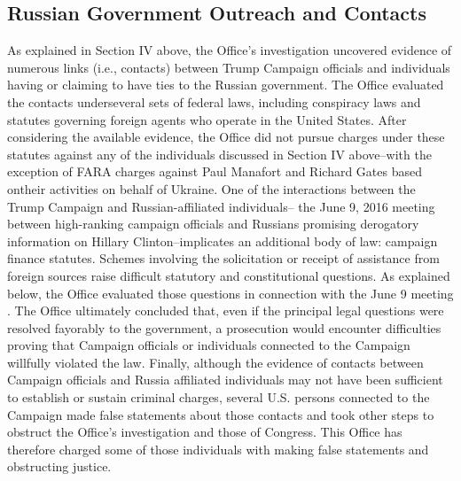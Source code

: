 \subsection{Russian Government Outreach and Contacts}
As explained in Section IV above, the Office's investigation uncovered evidence of numerous links (i.e., contacts) between Trump Campaign officials and individuals having or claiming to have ties to the Russian government. 
The Office evaluated the contacts underseveral sets of federal laws, including conspiracy laws and statutes governing foreign agents who operate in the United States. 
After considering the available evidence, the Office did not pursue charges under these statutes against any of the individuals discussed in Section IV above--with the exception of FARA charges against Paul Manafort and Richard Gates based ontheir activities on behalf of Ukraine. 
One of the interactions between the Trump Campaign and Russian-affiliated individuals-- the June 9, 2016 meeting between high-ranking campaign officials and Russians promising derogatory information on Hillary Clinton--implicates an additional body of law: campaign finance statutes. 
Schemes involving the solicitation or receipt of assistance from foreign sources raise difficult statutory and constitutional questions. 
As explained below, the Office evaluated those questions in connection with the June 9 meeting . 
The Office ultimately concluded that, even if the principal legal questions were resolved fayorably to the government, a prosecution would encounter difficulties proving that Campaign officials or individuals connected to the Campaign willfully violated the law. 
Finally, although the evidence of contacts between Campaign officials and Russia affiliated individuals may not have been sufficient to establish or sustain criminal charges, several U.S. persons connected to the Campaign made false statements about those contacts and took other steps to obstruct the Office's investigation and those of Congress. 
This Office has therefore charged some of those individuals with making false statements and obstructing justice.

